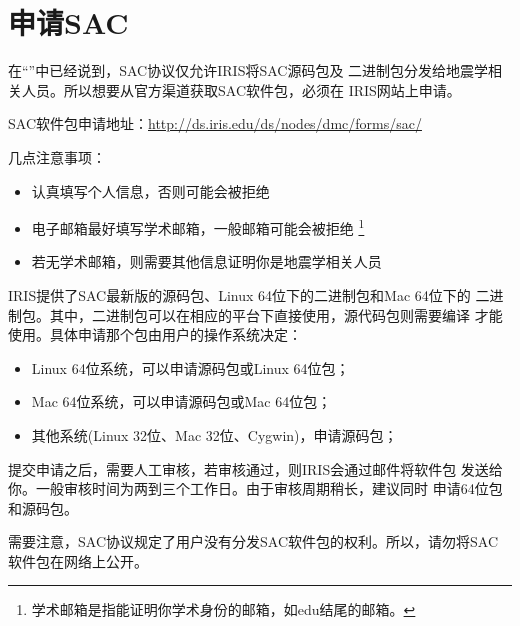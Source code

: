 \section{申请SAC}
在``''中已经说到，SAC协议仅允许IRIS将SAC源码包及
二进制包分发给地震学相关人员。所以想要从官方渠道获取SAC软件包，必须在
IRIS网站上申请。

SAC软件包申请地址：\url{http://ds.iris.edu/ds/nodes/dmc/forms/sac/}

几点注意事项：
\begin{itemize}
\item 认真填写个人信息，否则可能会被拒绝
\item 电子邮箱最好填写学术邮箱，一般邮箱可能会被拒绝
    \footnote{学术邮箱是指能证明你学术身份的邮箱，如edu结尾的邮箱。}
\item 若无学术邮箱，则需要其他信息证明你是地震学相关人员
\end{itemize}

IRIS提供了SAC最新版的源码包、Linux 64位下的二进制包和Mac 64位下的
二进制包。其中，二进制包可以在相应的平台下直接使用，源代码包则需要编译
才能使用。具体申请那个包由用户的操作系统决定：
\begin{itemize}
\item Linux 64位系统，可以申请源码包或Linux 64位包；
\item Mac 64位系统，可以申请源码包或Mac 64位包；
\item 其他系统(Linux 32位、Mac 32位、Cygwin)，申请源码包；
\end{itemize}

提交申请之后，需要人工审核，若审核通过，则IRIS会通过邮件将软件包
发送给你。一般审核时间为两到三个工作日。由于审核周期稍长，建议同时
申请64位包和源码包。

需要注意，SAC协议规定了用户没有分发SAC软件包的权利。所以，请勿将SAC
软件包在网络上公开。
